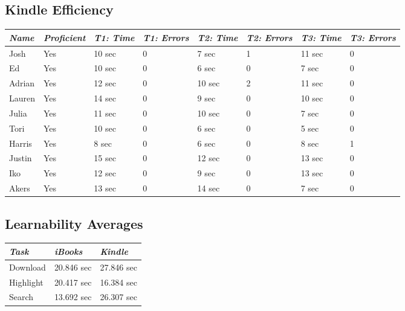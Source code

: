 \documentclass[journal,letterpaper]{article}
\begin{document}
    \subsection{Kindle Efficiency}
    \begin{center}
        \centering
        \begin{tabular}{|l|l|l|l|l|l|l|l|}
            \hline
            \emph{Name} & \emph{Proficient} & \emph{T1: Time} & \emph{T1: Errors} & \emph{T2: Time} & \emph{T2: Errors} & \emph{T3: Time} & \emph{T3: Errors} \\
            \hline
            Josh & Yes & 10 sec & 0 & 7 sec & 1 & 11 sec & 0 \\
            \hline
            Ed & Yes & 10 sec & 0 & 6 sec & 0 & 7 sec & 0 \\
            \hline
            Adrian & Yes & 12 sec & 0 & 10 sec & 2 & 11 sec & 0 \\
            \hline
            Lauren & Yes & 14 sec & 0 & 9 sec & 0 & 10 sec & 0 \\
            \hline
            Julia & Yes & 11 sec & 0 & 10 sec & 0 & 7 sec & 0 \\
            \hline
            Tori & Yes & 10 sec & 0 & 6 sec & 0 & 5 sec & 0 \\
            \hline
            Harris & Yes & 8 sec & 0 & 6 sec & 0 & 8 sec & 1 \\
            \hline
            Justin & Yes & 15 sec & 0 & 12 sec & 0 & 13 sec & 0 \\
            \hline
            Iko & Yes & 12 sec & 0 & 9 sec & 0 & 13 sec & 0 \\
            \hline
            Akers & Yes & 13 sec & 0 & 14 sec & 0 & 7 sec & 0 \\
        \end{tabular}
    \end{center}

    \subsection{Learnability Averages}
    \begin{center}
        \centering
        \begin{tabular}{|l||l|l|}
            \hline
            \emph{Task} & \emph{iBooks} & \emph{Kindle} \\
            \hline
            Download & 20.846 sec & 27.846 sec \\
            \hline
            Highlight & 20.417 sec & 16.384 sec \\
            \hline
            Search & 13.692 sec & 26.307 sec \\
        \end{tabular}
    \end{center}
\end{document}
